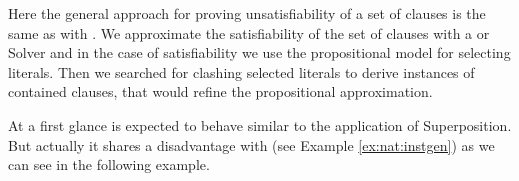 Here the general approach for proving unsatisfiability of a set of clauses is the same as with \InstGen. 
We approximate the satisfiability of the set of clauses with a \SAT or \SMT Solver and in the case
of satisfiability we use the propositional model for selecting literals. 
Then we searched for clashing selected literals to derive instances of contained clauses, 
that would refine the propositional approximation.






%



At a first glance \InstGenEQ is expected to behave similar to the application of Superposition. 
But actually it shares a disadvantage with \InstGen (see Example \ref{ex:nat:instgen}) as we can see in the following example.


